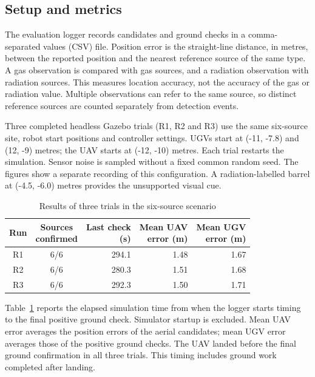 \documentclass[conference]{IEEEtran}
\begin{document}
\subsection{Setup and metrics}
The evaluation logger records candidates and ground checks in a comma-separated values (CSV) file. Position error is the straight-line distance, in metres, between the reported position and the nearest reference source of the same type. A gas observation is compared with gas sources, and a radiation observation with radiation sources. This measures location accuracy, not the accuracy of the gas or radiation value. Multiple observations can refer to the same source, so distinct reference sources are counted separately from detection events.

Three completed headless Gazebo trials (R1, R2 and R3) use the same six-source site, robot start positions and controller settings. UGVs start at (-11, -7.8) and (12, -9) metres; the UAV starts at (-12, -10) metres. Each trial restarts the simulation. Sensor noise is sampled without a fixed common random seed. The figures show a separate recording of this configuration. A radiation-labelled barrel at (-4.5, -6.0) metres provides the unsupported visual cue.

\begin{table}[t]
\caption{Results of three trials in the six-source scenario}
\label{tab:runs}
\centering
\small
\begin{tabular}{@{}ccrrr@{}}
\toprule
Run & \shortstack{Sources\\confirmed} & \shortstack{Last check\\(s)} & \shortstack{Mean UAV\\error (m)} & \shortstack{Mean UGV\\error (m)}\\
\midrule
R1 & 6/6 & 294.1 & 1.48 & 1.67\\
R2 & 6/6 & 280.3 & 1.51 & 1.68\\
R3 & 6/6 & 292.3 & 1.50 & 1.71\\
\bottomrule
\end{tabular}
\end{table}

Table~\ref{tab:runs} reports the elapsed simulation time from when the logger starts timing to the final positive ground check. Simulator startup is excluded. Mean UAV error averages the position errors of the aerial candidates; mean UGV error averages those of the positive ground checks. The UAV landed before the final ground confirmation in all three trials. This timing includes ground work completed after landing.
\end{document}
